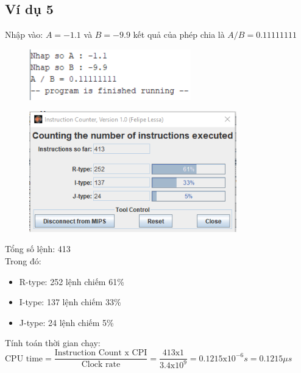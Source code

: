 \documentclass[a4paper]{article}
\begin{document}
\subsection{Ví dụ 5}
Nhập vào: $A = -1.1$ và $B = -9.9$ kết quả của phép chia là $A / B = 0.11111111$
\begin{center}
	\begin{figure}[h!]
		\begin{center}
			\includegraphics[width=7cm]{Images/4.png}
		\end{center}
	\end{figure}
\end{center}
\begin{center}
	\begin{figure}[h!]
		\begin{center}
			\includegraphics[width=9cm]{Images/5.png}
		\end{center}
	\end{figure}
\end{center}
Tổng số lệnh: 413\\
Trong đó:
\begin{itemize}
	\item R-type: 252 lệnh chiếm 61\%
	\item I-type: 137 lệnh chiếm 33\%
	\item J-type: 24 lệnh chiếm 5\%
\end{itemize}
Tính toán thời gian chạy:\\
$\text{CPU time} = \dfrac{\text{Instruction Count x CPI}}{\text{Clock rate}} = \dfrac{413\text{x}1}{3.4\text{x}10^9} = 0.1215 \text{x}10^{-6} s = 0.1215 \mu s$
\end{document}

